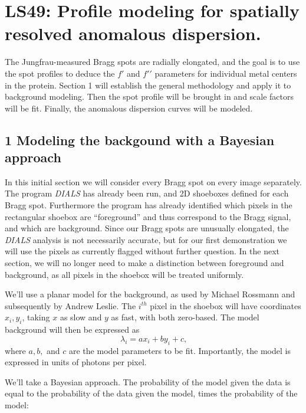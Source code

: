 \documentclass[12pt, letterpaper]{article}
\begin{document}

\section*{LS49: Profile modeling for spatially resolved anomalous dispersion. }
  \par The Jungfrau-measured Bragg spots are radially elongated, and the goal is to use the
  spot profiles to deduce the $f\prime$ and $f\prime\prime$ parameters for individual
  metal centers in the protein.  Section 1 will establish the general methodology and apply it 
  to background modeling.  Then the spot profile will be brought in and scale factors will be fit.
  Finally, the anomalous dispersion curves will be modeled. 
\subsection*{1 Modeling the backgound with a Bayesian approach}

  \par In this initial section we will consider every Bragg spot on every image separately.  
  The program \textit{DIALS} has already been run, and 2D shoeboxes defined for each Bragg 
  spot.  Furthermore the program has already identified which pixels in the rectangular shoebox are
  ``foreground'' and thus correspond to the Bragg signal, and which are background.  Since our
  Bragg spots are unusually elongated, the \textit{DIALS} analysis is not necessarily accurate, 
  but for our first demonstration we will use the pixels as currently flagged without further
  question.  In the next section, we will no longer need to make a distinction between foreground 
  and background, as all pixels in the shoebox will be treated uniformly.
  
  \par We'll use a planar model for the background, as used by Michael Rossmann and 
  subsequently by Andrew Leslie.  The $i^{th}$ pixel in the shoebox will have coordinates 
  $x_i, y_i$, taking $x$ as slow and $y$ as fast, with both zero-based.  The model background will then
  be expressed as 
    \begin{equation}
    \lambda_{i} = ax_i + by_i + c 
    \text{,}
    \label{eqn:RossmannB}
  \end{equation}
  where $a, b,$ and $c$ are the model parameters to be fit.  Importantly, the model is expressed in
  units of photons per pixel.
 
 \par   We'll take a Bayesian approach.  The probability of the model given the data is equal to the
 probability of the data given the model, times the probability of the model:
 
\end{document}
